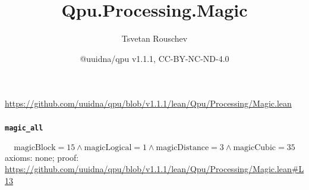 \documentclass[11pt]{article}
\title{Qpu.Processing.Magic}
\author{Tsvetan Rouschev}
\date{@uuidna/qpu v1.1.1, CC-BY-NC-ND-4.0}
\begin{document}
\maketitle
\noindent\url{https://github.com/uuidna/qpu/blob/v1.1.1/lean/Qpu/Processing/Magic.lean}

\paragraph{\texttt{magic\_all}}
\[ \mathrm{magicBlock} = 15 \land \mathrm{magicLogical} = 1 \land \mathrm{magicDistance} = 3 \land \mathrm{magicCubic} = 35 \]
\noindent axioms: none; proof: \url{https://github.com/uuidna/qpu/blob/v1.1.1/lean/Qpu/Processing/Magic.lean\#L13}
\end{document}
